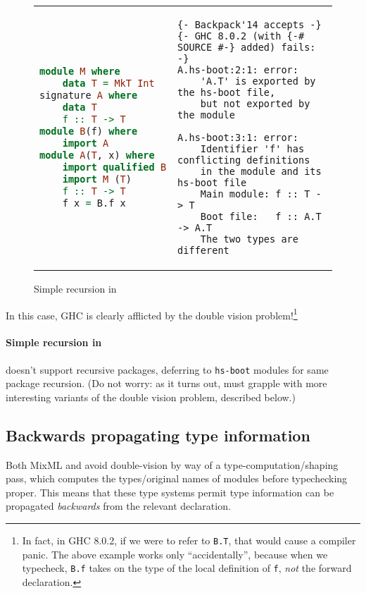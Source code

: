 \begin{figure}[H]
\begin{tabular}{p{} p{}}
\begin{lstlisting}[language=Haskell,escapechar=@]
module M where
    data T = MkT Int
signature A where
    data T
    f :: T -> T
module B(f) where
    import A
module A(T, x) where
    import qualified B
    import M (T)
    f :: T -> T
    f x = B.f x
\end{lstlisting}
&
\begin{verbatim}
{- Backpack'14 accepts -}
{- GHC 8.0.2 (with {-# SOURCE #-} added) fails: -}
A.hs-boot:2:1: error:
    'A.T' is exported by the hs-boot file,
    but not exported by the module

A.hs-boot:3:1: error:
    Identifier 'f' has conflicting definitions
    in the module and its hs-boot file
    Main module: f :: T -> T
    Boot file:   f :: A.T -> A.T
    The two types are different
\end{verbatim}
\end{tabular}
\caption{Simple recursion in \OldBackpack{}}
\label{fig:double-vision-simple-recursion-old-backpack}
\end{figure}

\noindent
In this case, GHC is clearly afflicted by the double vision
problem!\footnote{In fact, in GHC 8.0.2, if we were to refer to
\texttt{B.T}, that would cause a compiler panic.  The above example works
only ``accidentally'', because when we typecheck, \texttt{B.f} takes
on the type of the local definition of \texttt{f}, \emph{not} the
forward declaration.}

\paragraph{Simple recursion in \Backpack{}}

\Backpack{} doesn't support recursive packages, deferring to \verb|hs-boot|
modules for same package recursion.  (Do not worry: as it turns out, \Backpack{}
must grapple with more interesting variants of the double vision problem, described
below.)

\subsection{Backwards propagating type information}

Both MixML and \OldBackpack{} avoid double-vision by way of a
type-computation/shaping pass, which computes the types/original names
of modules before typechecking proper.  This means that these
type systems permit type information can be propagated \emph{backwards}
from the relevant declaration.

